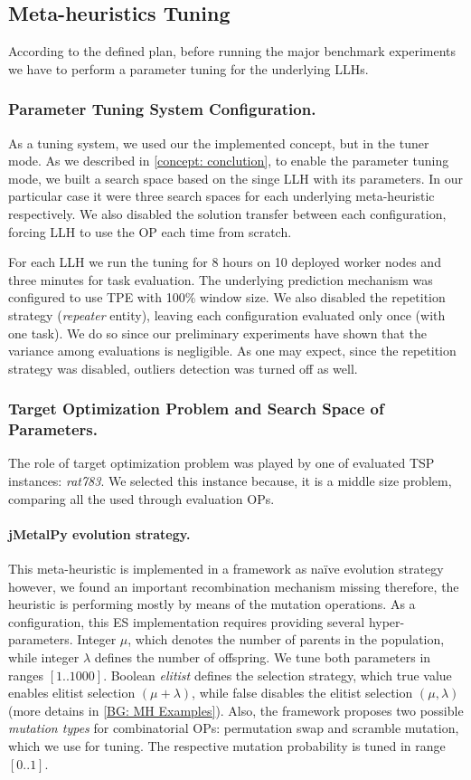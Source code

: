 \subsection{Meta-heuristics Tuning}\label{eval: mh tuning}
According to the defined plan, before running the major benchmark experiments we have to perform a parameter tuning for the underlying LLHs.

\subsubsection{Parameter Tuning System Configuration.} 
As a tuning system, we used our the implemented concept, but in the tuner mode. As we described in \cref{concept: conclution}, to enable the parameter tuning mode, we built a search space based on the singe LLH with its parameters. In our particular case it were three search spaces for each underlying meta-heuristic respectively. We also disabled the solution transfer between each configuration, forcing LLH to use the OP each time from scratch.

For each LLH we run the tuning for 8 hours on 10 deployed worker nodes and three minutes for task evaluation. The underlying prediction mechanism was configured to use TPE with 100\% window size. We also disabled the repetition strategy (\emph{repeater} entity), leaving each configuration evaluated only once (with one task). We do so since our preliminary experiments have shown that the variance among evaluations is negligible. As one may expect, since the repetition strategy was disabled, outliers detection was turned off as well.

\subsubsection{Target Optimization Problem and Search Space of Parameters.} 
The role of target optimization problem was played by one of evaluated TSP instances: \emph{rat783}. We selected this instance because, it is a middle size problem, comparing all the used through evaluation OPs.

\paragraph{jMetalPy evolution strategy.} This meta-heuristic is implemented in a framework as na\"ive evolution strategy however, we found an important recombination mechanism missing therefore, the heuristic is performing mostly by means of the mutation operations. As a configuration, this ES implementation requires providing several hyper-parameters. Integer $\mu$, which denotes the number of parents in the population, while integer $\lambda$ defines the number of offspring. We tune both parameters in ranges $[1..1000]$. Boolean \emph{elitist} defines the selection strategy, which true value enables elitist selection $(\mu+\lambda)$, while false disables the elitist selection $(\mu,\lambda)$ (more detains in \cref{BG: MH Examples}). Also, the framework proposes two possible \emph{mutation types} for combinatorial OPs: permutation swap and scramble mutation, which we use for tuning. The respective mutation probability is tuned in range $[0..1]$.

